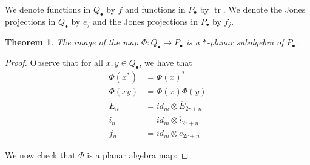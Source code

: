 \documentclass[11pt]{article}
\theoremstyle{plain}
\newtheorem{thm}{Theorem}[section]
\theoremstyle{definition}
\DeclareMathOperator{\tr}{tr}
\begin{document}
We denote functions in $Q_{\bullet}$ by $\overline{f}$ and functions in $P_{\bullet}$ by $\tr$. We denote the Jones projections in $Q_{\bullet}$ by $e_{j}$ and the Jones projections in  $P_{\bullet}$ by $f_{j}$.

\begin{thm}
The image of the map $\Phi:Q_{\bullet} \to P_{\bullet}$ is a $\ast$-planar subalgebra of $P_{\bullet}$.
\end{thm} 

\begin{proof}
Observe that for all $x,y \in Q_{\bullet}$, we have that 
\begin{align}
	\Phi(x^{*}) &= \Phi(x)^{\ast} \\
	\Phi(xy) &= \Phi(x)\Phi(y) \\
	E_n &= id_{m}\otimes \overline{E}_{2r+n} \\
	i_n &= id_{m}\otimes \overline{i}_{2r+n} \\
	f_n &= id_{m} \otimes e_{2r+n} 
\end{align}

	We now check that $\Phi$ is a planar algebra map:


\end{proof}
\end{document}
